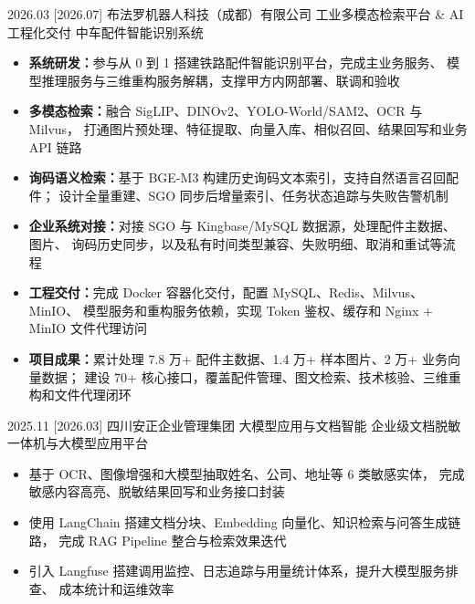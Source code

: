 \documentclass[zh]{resume}
\begin{document}
\newpage
{}
\begingroup
\small
\setlength{\LTpre}{0pt}
\setlength{\LTpost}{0pt}
\begin{projects}
  \project%
    {2026.03}%
    [2026.07]%
    {布法罗机器人科技（成都）有限公司}%
    {工业多模态检索平台 \& AI 工程化交付}%
    {中车配件智能识别系统}%
    {%
      \begin{itemize}
        \item \textbf{系统研发：}参与从 0 到 1 搭建铁路配件智能识别平台，完成主业务服务、
          模型推理服务与三维重构服务解耦，支撑甲方内网部署、联调和验收
        \item \textbf{多模态检索：}融合 SigLIP、DINOv2、YOLO-World/SAM2、OCR 与 Milvus，
          打通图片预处理、特征提取、向量入库、相似召回、结果回写和业务 API 链路
        \item \textbf{询码语义检索：}基于 BGE-M3 构建历史询码文本索引，支持自然语言召回配件；
          设计全量重建、SGO 同步后增量索引、任务状态追踪与失败告警机制
        \item \textbf{企业系统对接：}对接 SGO 与 Kingbase/MySQL 数据源，处理配件主数据、图片、
          询码历史同步，以及私有时间类型兼容、失败明细、取消和重试等流程
        \item \textbf{工程交付：}完成 Docker 容器化交付，配置 MySQL、Redis、Milvus、MinIO、
          模型服务和重构服务依赖，实现 Token 鉴权、缓存和 Nginx + MinIO 文件代理访问
        \item \textbf{项目成果：}累计处理 7.8 万+ 配件主数据、1.4 万+ 样本图片、2 万+ 业务向量数据；
          建设 70+ 核心接口，覆盖配件管理、图文检索、技术核验、三维重构和文件代理闭环
      \end{itemize}
    }
  \separator{0.35ex}
  \project%
    {2025.11}%
    [2026.03]%
    {四川安正企业管理集团}%
    {大模型应用与文档智能}%
    {企业级文档脱敏一体机与大模型应用平台}%
    {%
      \begin{itemize}
        \item 基于 OCR、图像增强和大模型抽取姓名、公司、地址等 6 类敏感实体，
          完成敏感内容高亮、脱敏结果回写和业务接口封装
        \item 使用 LangChain 搭建文档分块、Embedding 向量化、知识检索与问答生成链路，
          完成 RAG Pipeline 整合与检索效果迭代
        \item 引入 Langfuse 搭建调用监控、日志追踪与用量统计体系，提升大模型服务排查、
          成本统计和运维效率

\end{itemize}}
\end{projects}
\end{document}
